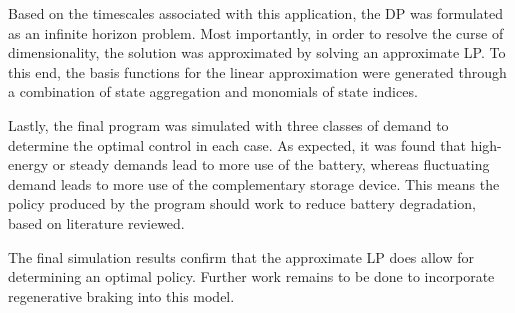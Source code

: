 \documentclass[conference]{IEEEtran}
\begin{document}
Based on the timescales associated with this application, the DP was formulated as an infinite horizon problem. Most importantly, in order to resolve the curse of dimensionality, the solution was approximated by solving an approximate LP. To this end, the basis functions for the linear approximation were generated through a combination of state aggregation and monomials of state indices.

Lastly, the final program was simulated with three classes of demand to determine the optimal control in each case. As expected, it was found that high-energy or steady demands lead to more use of the battery, whereas fluctuating demand leads to more use of the complementary storage device. This means the policy produced by the program should work to reduce battery degradation, based on literature reviewed.

The final simulation results confirm that the approximate LP does allow for determining an optimal policy. Further work remains to be done to incorporate regenerative braking into this model.

\printbibliography
\end{document}
